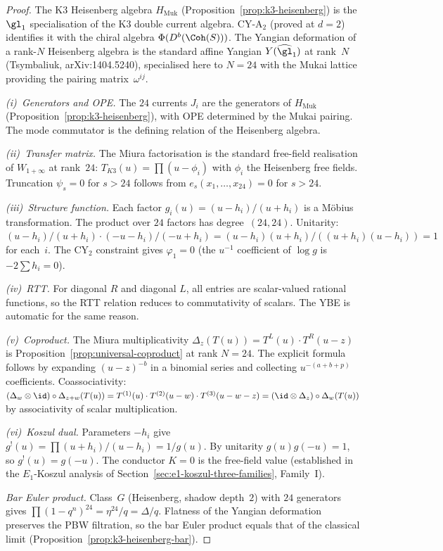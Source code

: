 \begin{proof}
The K3 Heisenberg algebra $H_{\mathrm{Muk}}$
(Proposition~\ref{prop:k3-heisenberg}) is the $\gl_1$
specialisation of the K3 double current algebra.
CY-A$_2$ (proved at $d = 2$) identifies it with the chiral algebra
$\Phi(D^b(\Coh(S)))$.
The Yangian deformation of a rank-$N$ Heisenberg algebra is the
standard affine Yangian $Y(\widehat{\gl}_1)$ at rank~$N$
(Tsymbaliuk, arXiv:1404.5240), specialised here to $N = 24$ with the
Mukai lattice providing the pairing matrix~$\omega^{ij}$.

\emph{(i)~Generators and OPE.}
The $24$ currents $J_i$ are the generators of $H_{\mathrm{Muk}}$
(Proposition~\ref{prop:k3-heisenberg}), with OPE determined by the
Mukai pairing. The mode commutator is the defining relation of the
Heisenberg algebra.

\emph{(ii)~Transfer matrix.}
The Miura factorisation is the standard free-field realisation
of $W_{1+\infty}$ at rank~$24$: $T_{K3}(u) = \prod(u - \phi_i)$
with $\phi_i$ the Heisenberg free fields.
Truncation $\psi_s = 0$ for $s > 24$ follows from
$e_s(x_1, \ldots, x_{24}) = 0$ for $s > 24$.

\emph{(iii)~Structure function.}
Each factor $g_i(u) = (u - h_i)/(u + h_i)$ is a M\"obius
transformation. The product over $24$ factors has degree~$(24,24)$.
Unitarity: $(u-h_i)/(u+h_i) \cdot (-u-h_i)/(-u+h_i) =
(u-h_i)(u+h_i)/((u+h_i)(u-h_i)) = 1$ for each~$i$.
The CY$_2$ constraint gives $\varphi_1 = 0$ (the $u^{-1}$ coefficient
of $\log g$ is $-2\sum h_i = 0$).

\emph{(iv)~RTT.}
For diagonal $R$ and diagonal $L$, all entries are scalar-valued
rational functions, so the RTT relation reduces to commutativity
of scalars. The YBE is automatic for the same reason.

\emph{(v)~Coproduct.}
The Miura multiplicativity $\Delta_z(T(u)) = T^L(u) \cdot T^R(u-z)$
is Proposition~\ref{prop:universal-coproduct} at rank $N = 24$.
The explicit formula follows by expanding $(u-z)^{-b}$ in a
binomial series and collecting $u^{-(a+b+p)}$ coefficients.
Coassociativity:
$({\Delta_w \otimes \id}) \circ \Delta_{z+w}(T(u)) =
T^{(1)}(u) \cdot T^{(2)}(u-w) \cdot T^{(3)}(u-w-z) =
({\id \otimes \Delta_z}) \circ \Delta_w(T(u))$
by associativity of scalar multiplication.

\emph{(vi)~Koszul dual.}
Parameters $-h_i$ give $g^!(u) = \prod(u+h_i)/(u-h_i) = 1/g(u)$.
By unitarity $g(u)g(-u) = 1$, so $g^!(u) = g(-u)$.
The conductor $K = 0$ is the free-field value
(established in the $E_1$-Koszul analysis of
Section~\ref{sec:e1-koszul-three-families},
Family~I).

\emph{Bar Euler product.}
Class~$G$ (Heisenberg, shadow depth~$2$) with $24$ generators gives
$\prod(1-q^n)^{24} = \eta^{24}/q = \Delta/q$.
Flatness of the Yangian deformation preserves the PBW filtration,
so the bar Euler product equals that of the classical limit
(Proposition~\ref{prop:k3-heisenberg-bar}).
\end{proof}

